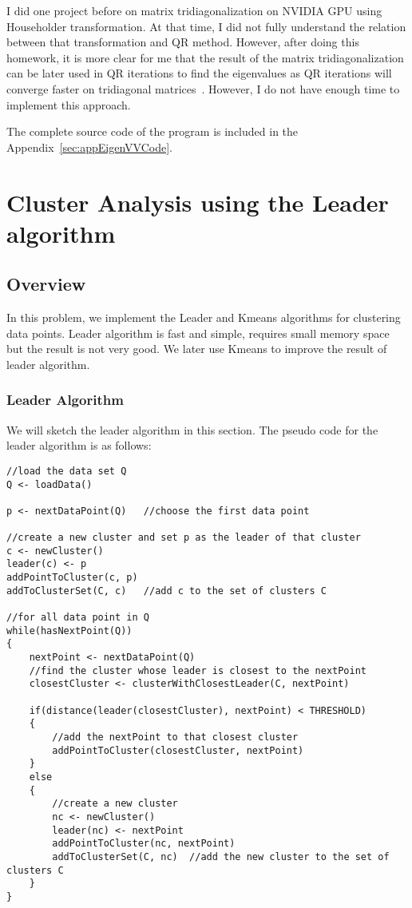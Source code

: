\documentclass{article}
\begin{document}
I did one project before on matrix tridiagonalization on NVIDIA GPU using
Householder transformation. At that time, I did not fully understand the
relation between that transformation and QR method. However, after doing this
homework, it is more clear for me that the result of the matrix
tridiagonalization can be later used in QR iterations to find the eigenvalues
as QR iterations will converge faster on tridiagonal
matrices~\cite{MathewsNumericalMethodMatlab, PressNumericalRecipes}. However, I
do not have enough time to implement this approach.

The complete source code of the program is included in the
Appendix~\ref{sec:appEigenVVCode}.

\section{Cluster Analysis using the Leader algorithm}
\subsection{Overview}
In this problem, we implement the Leader and Kmeans algorithms for clustering
data points. Leader algorithm is fast and simple, requires small memory
space but the result is not very good. We later use Kmeans to improve the
result of leader algorithm.
\subsubsection{Leader Algorithm}
We will sketch the leader algorithm in this section. The pseudo code for the
leader algorithm is as follows:
\begin{lstlisting}
//load the data set Q
Q <- loadData()

p <- nextDataPoint(Q)	//choose the first data point

//create a new cluster and set p as the leader of that cluster
c <- newCluster()
leader(c) <- p
addPointToCluster(c, p)	
addToClusterSet(C, c)	//add c to the set of clusters C

//for all data point in Q
while(hasNextPoint(Q))
{
	nextPoint <- nextDataPoint(Q)
	//find the cluster whose leader is closest to the nextPoint
	closestCluster <- clusterWithClosestLeader(C, nextPoint)
	
	if(distance(leader(closestCluster), nextPoint) < THRESHOLD)
	{
		//add the nextPoint to that closest cluster
		addPointToCluster(closestCluster, nextPoint)
	}
	else
	{
		//create a new cluster
		nc <- newCluster()
		leader(nc) <- nextPoint
		addPointToCluster(nc, nextPoint)	
		addToClusterSet(C, nc)	//add the new cluster to the set of clusters C
	}
}
\end{lstlisting}
\end{document}

